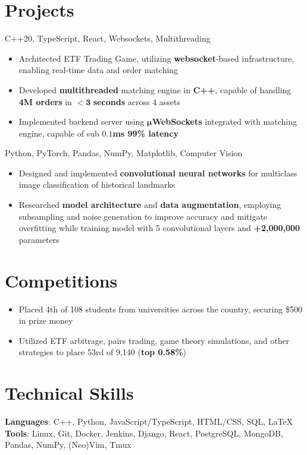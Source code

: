 \documentclass[letterpaper,11pt]{article}
\begin{document}
\section{Projects}
{C++20, TypeScript, React, Websockets, Multithreading}{}
\begin{itemize}
  \item Architected ETF Trading Game, utilizing \textbf{websocket}-based
        infrastructure, enabling real-time data and order matching
  \item Developed \textbf{multithreaded} matching engine in \textbf{C++}, capable of
        handling \textbf{4M orders} in $\mathbf{< 3}$ \textbf{seconds} across 4 assets
  \item Implemented backend server using $\mathbf{\mu}$\textbf{WebSockets}
        integrated with matching engine, capable of sub $\mathbf{0.1}$\textbf{ms 99\% latency}
\end{itemize}
{Python, PyTorch, Pandas, NumPy, Matplotlib, Computer Vision}{}
\begin{itemize}
  \item Designed and implemented \textbf{convolutional neural networks} for multiclass
        image classification of historical landmarks
  \item Researched \textbf{model architecture} and \textbf{data augmentation},
        employing subsampling and noise generation to improve accuracy and mitigate
        overfitting while training model with 5 convolutional layers and
        \textbf{+2,000,000} parameters
\end{itemize}
\section{Competitions}
\begin{itemize}
  \item Placed 4th of 108 students from universities across the country, securing \$500 in prize money
\end{itemize}
\begin{itemize}
  \item Utilized ETF arbitrage, pairs trading, game theory simulations, and
        other strategies to place 53rd of 9,140 (\textbf{top 0.58\%})
\end{itemize}
\section{Technical Skills}
\textbf{Languages}: C++, Python, JavaScript/TypeScript, HTML/CSS, SQL, \LaTeX
\\
\textbf{Tools}: Linux, Git, Docker, Jenkins, Django, React, PostgreSQL,
MongoDB, Pandas, NumPy, (Neo)Vim, Tmux
\end{document}
